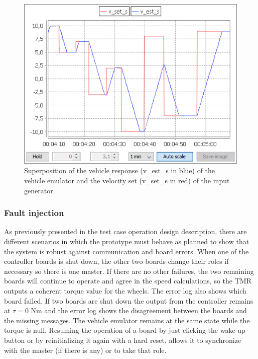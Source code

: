 \documentclass[table,xcdraw]{article}
\begin{document}
\begin{figure}[h!]
    \centering
    \includegraphics[scale = 0.7]{figures/results/vehicle_response_13Jan22.jpg}
    \caption{Superposition of the vehicle response (v\_est\_s in blue) of the vehicle emulator and the velocity set (v\_set\_s in red) of the input generator.}
    \label{fig:vehicle_response}
\end{figure}

\subsubsection{Fault injection}
As previously presented in the test case operation design description, there are different scenarios in which the prototype must behave as planned to show that the system is robust against communication and board errors. When one of the controller boards is shut down, the other two boards change their roles if necessary so there is one master. If there are no other failures, the two remaining boards will continue to operate and agree in the speed calculations, so the TMR outputs a coherent torque value for the wheels. The error log also shows which board failed. If two boards are shut down the output from the controller remains at $\tau = 0$ Nm and the error log shows the disagreement between the boards and the missing messages. The vehicle emulator remains at the same state while the torque is null. Resuming the operation of a board by just clicking the wake-up button or by reinitializing it again with a hard reset, allows it to synchronize with the master (if there is any) or to take that role.
\end{document}

